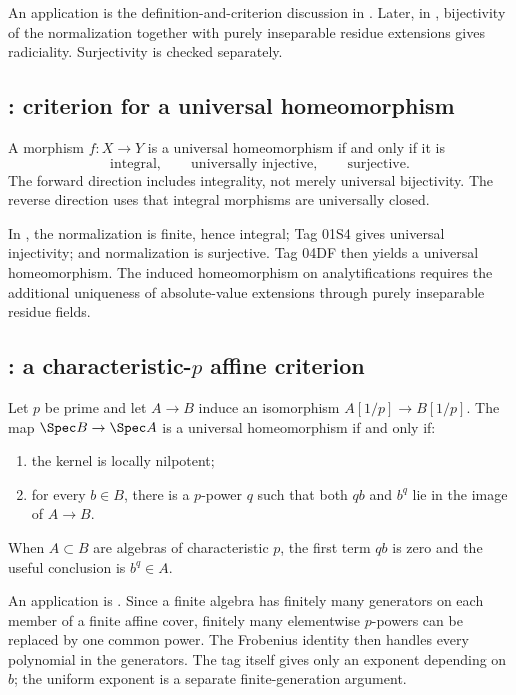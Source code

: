 An application is the definition-and-criterion discussion in
. Later, in
, bijectivity of the
normalization together with purely inseparable residue extensions gives
radiciality. Surjectivity is checked separately.

\subsection*{: criterion for a universal homeomorphism}
\label{sec:stacks-tag-04DF}

A morphism \(f:X\to Y\) is a universal homeomorphism if and only if it is
\[
                 \text{integral},\qquad
                 \text{universally injective},\qquad
                 \text{surjective}.
\]
The forward direction includes integrality, not merely universal
bijectivity. The reverse direction uses that integral morphisms are
universally closed.

In , the normalization
is finite, hence integral; Tag 01S4 gives universal injectivity; and
normalization is surjective. Tag 04DF then yields a universal
homeomorphism. The induced homeomorphism on analytifications requires the
additional uniqueness of absolute-value extensions through purely
inseparable residue fields.

\subsection*{: a characteristic-\(p\) affine criterion}
\label{sec:stacks-tag-0CNF}

Let \(p\) be prime and let \(A\to B\) induce an isomorphism
\(A[1/p]\to B[1/p]\). The map
\(\Spec B\to\Spec A\) is a universal homeomorphism if and only if:
\begin{enumerate}
\item the kernel is locally nilpotent;
\item for every \(b\in B\), there is a \(p\)-power \(q\) such that both
\(qb\) and \(b^q\) lie in the image of \(A\to B\).
\end{enumerate}
When \(A\subset B\) are algebras of characteristic \(p\), the first term
\(qb\) is zero and the useful conclusion is \(b^q\in A\).

An application is . Since a
finite algebra has finitely many generators on each member of a finite
affine cover, finitely many elementwise \(p\)-powers can be replaced by one
common power. The Frobenius identity then handles every polynomial in the
generators. The tag itself gives only an exponent depending on \(b\); the
uniform exponent is a separate finite-generation argument.

